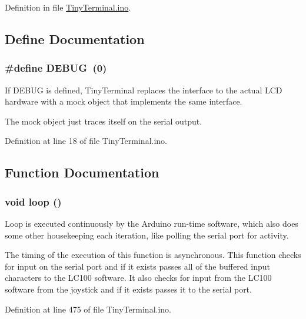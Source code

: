 Definition in file \hyperlink{TinyTerminal_8ino_source}{TinyTerminal.ino}.



\subsection{Define Documentation}
\hypertarget{TinyTerminal_8ino_ad72dbcf6d0153db1b8d8a58001feed83}{
\subsubsection[{DEBUG}]{\setlength{\rightskip}{0pt plus 5cm}\#define DEBUG~(0)}}
\label{TinyTerminal_8ino_ad72dbcf6d0153db1b8d8a58001feed83}


If DEBUG is defined, TinyTerminal replaces the interface to the actual LCD hardware with a mock object that implements the same interface. 

The mock object just traces itself on the serial output. 

Definition at line 18 of file TinyTerminal.ino.



\subsection{Function Documentation}
\hypertarget{TinyTerminal_8ino_afe461d27b9c48d5921c00d521181f12f}{
\subsubsection[{loop}]{\setlength{\rightskip}{0pt plus 5cm}void loop ()}}
\label{TinyTerminal_8ino_afe461d27b9c48d5921c00d521181f12f}


Loop is executed continuously by the Arduino run-\/time software, which also does some other housekeeping each iteration, like polling the serial port for activity. 

The timing of the execution of this function is asynchronous. This function checks for input on the serial port and if it exists passes all of the buffered input characters to the LC100 software. It also checks for input from the LC100 software from the joystick and if it exists passes it to the serial port. 

Definition at line 475 of file TinyTerminal.ino.



